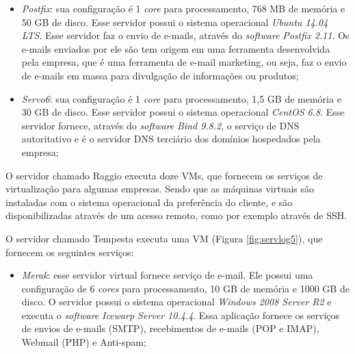 \begin{itemize}
 \item \textit{Postfix}: sua configuração é 1 \textit{core} para processamento, 768 MB de memória e 50 GB de disco. Esse servidor possui o 
 sistema operacional \textit{Ubuntu 14.04 \ac{LTS}}. Esse servidor faz o envio de e-mails, através do \textit{software} \textit{Postfix 2.11}.
 Os e-mails enviados por ele são tem origem em uma ferramenta desenvolvida pela empresa, que é uma ferramenta de e-mail marketing, ou seja, 
 faz o envio de e-mails em massa para divulgação de informações ou produtos;
 
 \item \textit{Servo6}: sua configuração é 1 \textit{core} para processamento, 1,5 GB de memória e 30 GB de disco. Esse servidor possui o 
 sistema operacional \textit{CentOS 6.8}. Esse servidor fornece, através do \textit{software} \textit{Bind 9.8.2}, o serviço de \ac{DNS} 
 autoritativo e é o servidor \ac{DNS} terciário dos domínios hospedados pela empresa;
\end{itemize}

O servidor chamado Raggio executa doze \ac{VM}s, que fornecem os serviços de virtualização para algumas empresas. Sendo que as máquinas virtuais
são instaladas com o sistema operacional da preferência do cliente, e são disponibilizadas através de um acesso remoto, como por exemplo através
de \ac{SSH}.

O servidor chamado Tempesta executa uma \ac{VM} (Figura \ref{fig:servlog5}), que fornecem os seguintes serviços:
\begin{itemize}
  \item \textit{Merak}: esse servidor virtual fornece serviço de e-mail. Ele possui uma configuração de 6 \textit{cores} para processamento, 
 10 GB de memória e 1000 GB de disco. O servidor possui o sistema operacional \textit{Windows 2008 Server R2} e executa o \textit{software} 
 \textit{Icewarp Server 10.4.4}. Essa aplicação fornece os serviços de envios de e-mails (\ac{SMTP}), recebimentos de e-mails (\ac{POP} e 
 \ac{IMAP}), Webmail (\ac{PHP}) e Anti-spam;

\end{itemize}

